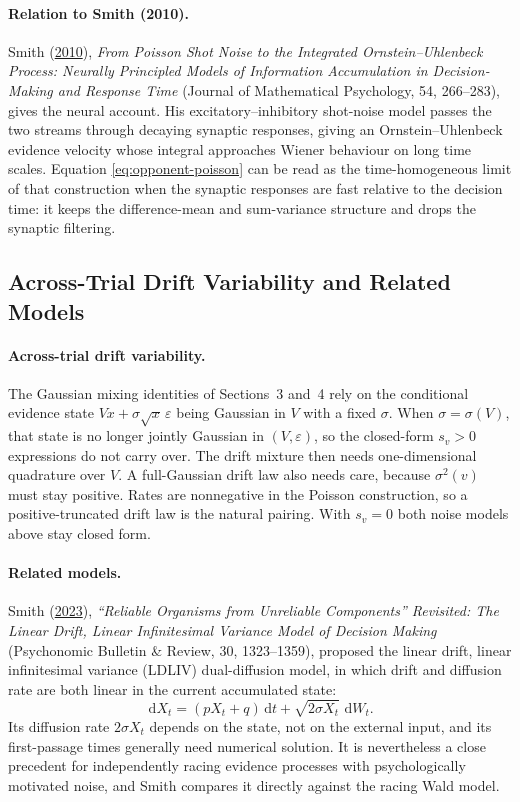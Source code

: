 \documentclass[12pt]{article}
\newcommand{\dd}{\,\mathrm{d}}
\begin{document}
\paragraph{Relation to Smith (2010).}
Smith (\href{https://doi.org/10.1016/j.jmp.2009.12.002}{2010}), \emph{From Poisson Shot Noise to the Integrated Ornstein--Uhlenbeck Process: Neurally Principled Models of Information Accumulation in Decision-Making and Response Time} (Journal of Mathematical Psychology, 54, 266--283), gives the neural account. His excitatory--inhibitory shot-noise model passes the two streams through decaying synaptic responses, giving an Ornstein--Uhlenbeck evidence velocity whose integral approaches Wiener behaviour on long time scales. Equation
\eqref{eq:opponent-poisson} can be read as the time-homogeneous limit of that
construction when the synaptic responses are fast relative to the decision time: it keeps the difference-mean and sum-variance structure and drops the synaptic filtering.

\subsection{Across-Trial Drift Variability and Related Models}
\label{sec:noise-sv}
\paragraph{Across-trial drift variability.}
The Gaussian mixing identities of Sections~3 and~4 rely on the conditional evidence state $Vx+\sigma\sqrt x\,\varepsilon$ being Gaussian in $V$ with a fixed $\sigma$. When $\sigma=\sigma(V)$, that state is no longer jointly Gaussian in $(V,\varepsilon)$, so the closed-form $s_v>0$ expressions do not carry over. The drift mixture then needs one-dimensional quadrature over $V$. A full-Gaussian drift law also needs care, because $\sigma^2(v)$ must stay positive. Rates are nonnegative in the Poisson construction, so a positive-truncated drift law is the natural pairing. With $s_v=0$ both noise models above stay closed form.

\paragraph{Related models.}
Smith (\href{https://doi.org/10.3758/s13423-022-02237-3}{2023}), \emph{``Reliable Organisms from Unreliable Components'' Revisited: The Linear Drift, Linear Infinitesimal Variance Model of Decision Making} (Psychonomic Bulletin \& Review, 30, 1323--1359), proposed the linear drift, linear infinitesimal variance (LDLIV) dual-diffusion model, in which drift and diffusion rate are both linear in the current accumulated state:
\begin{equation}
  \dd X_t=(pX_t+q)\dd t+\sqrt{2\sigma X_t}\,\dd W_t .
\end{equation}
Its diffusion rate $2\sigma X_t$ depends on the state, not on the external input, and its first-passage times generally need numerical solution. It is nevertheless a close precedent for independently racing evidence processes with psychologically motivated noise, and Smith compares it directly against the racing Wald model.
\end{document}
